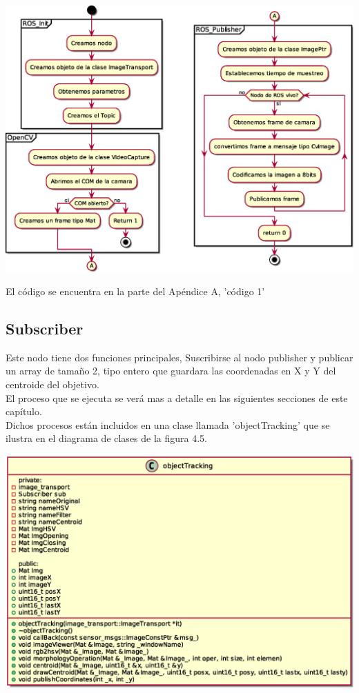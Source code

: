 \begin{center}
	\includegraphics[width=1.0 \textwidth]{Contenido/Cuerpo/Capitulo4/publisher.eps}
	\label{Fig5}
\end{center}
El código se encuentra en la parte del Apéndice A, 'código 1'

\subsection{Subscriber}
Este nodo tiene dos funciones principales, Suscribirse al nodo publisher y publicar
un array de tamaño 2, tipo entero que guardara las coordenadas en X y Y del centroide
del objetivo.\\
El proceso que se ejecuta se verá mas a detalle en las siguientes secciones de este
capítulo.\\
Dichos procesos están incluidos en una clase llamada 'objectTracking' que se ilustra
en el diagrama de clases de la figura 4.5.
\begin{center}
	\includegraphics[width=1.0 \textwidth]{Contenido/Cuerpo/Capitulo4/object_tracking.eps}
	\label{Fig5}
\end{center}


